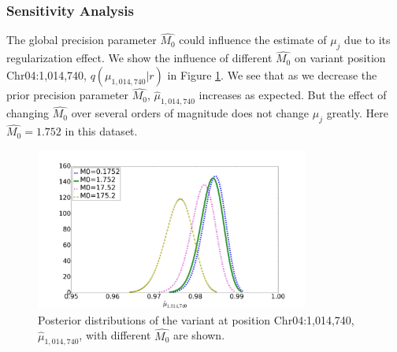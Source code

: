 \documentclass{bmcart}
\begin{document}
\subsubsection{Sensitivity Analysis}
The global precision parameter $\hat{M_0}$ could influence the estimate of $\mu_j$ due to its regularization effect.
We show the influence of different $\hat{M_0}$ on variant position Chr04:1,014,740, $q(\mu_{1,014,740}|r)$ in Figure \ref{tbl:M0}.
We see that as we decrease the prior precision parameter $\hat{M_0}$, $\hat{\mu}_{1,014,740}$ increases as expected.
But the effect of changing $\hat{M_0}$ over several orders of magnitude does not change $\mu_j$ greatly.
Here $\hat{M_0} = 1.752$ in this dataset.
\begin{figure}[htbp]
\centering
\includegraphics[width=0.8\textwidth]{M0.png}
\caption{
Posterior distributions of the variant at position Chr04:1,014,740, $\hat{\mu}_{1,014,740}$, with different $\hat{M_0}$ are shown.}
\label{tbl:M0}
\end{figure}

\end{document}
